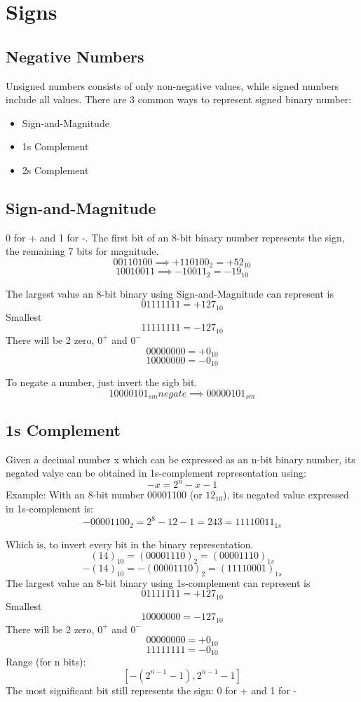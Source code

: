 \documentclass[12pt]{article} %
\begin{document}
\section{Signs} 
\subsection*{Negative Numbers}
Unsigned numbers consists of only non-negative values, while signed numbers include all values.
There are 3 common ways to represent signed binary number: 
\begin{itemize}
    \item Sign-and-Magnitude
    \item 1s Complement
    \item 2s Complement
\end{itemize}
\subsection{Sign-and-Magnitude}
0 for + and 
1 for -.
The first bit of an 8-bit binary number represents the sign, the remaining 7 bits for magnitude.
\[00110100 \implies +110100_2 = +52_{10}\]
\[10010011 \implies -10011_2 = -19_{10}\]

The largest value an 8-bit binary using Sign-and-Magnitude can represent is 
\[01111111 = +127_{10}\]
Smallest
\[11111111 = -127_{10}\]
There will be 2 zero, \(0^+\) and \(0^-\)
\[00000000 = +0_{10}\]
\[10000000 = -0_{10}\]

To negate a number, just invert the sigb bit.
\[10000101_{sm} negate \implies 00000101_{sm}\]

\subsection{1s Complement}
Given a decimal number x which can be expressed as an n-bit binary number, its negated valye can be obtained in 1s-complement representation using:
\[-x = 2^n -x - 1\]
Example: With an 8-bit number 00001100 (or \(12_{10}\)), its negated value expressed in 1s-complement is:
\[-00001100_2 = 2^8 - 12 - 1 = 243 = 11110011_{1s}\]

Which is, to invert every bit in the binary representation.
\[(14)_{10} = (00001110)_2 = (00001110)_{1s}\]
\[-(14)_{10} = -(00001110)_2 = (11110001)_{1s}\]
The largest value an 8-bit binary using 1s-complement can represent is 
\[01111111 = +127_{10}\]
Smallest
\[10000000 = -127_{10}\]
There will be 2 zero, \(0^+\) and \(0^-\)
\[00000000 = +0_{10}\]
\[11111111 = -0_{10}\]
Range (for n bits): 
\[[-(2^{n - 1} - 1), 2^{n - 1} - 1]\]
The most significant bit still represents the sign: 
0 for + and 
1 for -
\end{document}
